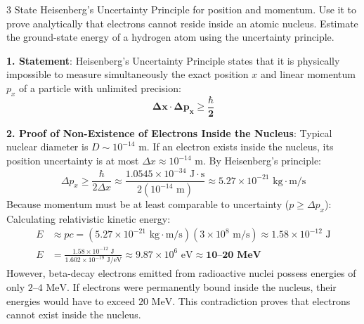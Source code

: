 \vspace{4mm}

\begin{theoryq}{3}
State Heisenberg's Uncertainty Principle for position and momentum. Use it to prove analytically that electrons cannot reside inside an atomic nucleus. Estimate the ground-state energy of a hydrogen atom using the uncertainty principle.
\end{theoryq}
\begin{theorysol}
\textbf{1. Statement}:
Heisenberg's Uncertainty Principle states that it is physically impossible to measure simultaneously the exact position $x$ and linear momentum $p_x$ of a particle with unlimited precision:
\begin{equation}
\mathbf{\Delta x \cdot \Delta p_x \ge \frac{\hbar}{2}}
\end{equation}

\textbf{2. Proof of Non-Existence of Electrons Inside the Nucleus}:
Typical nuclear diameter is $D \sim 10^{-14}\text{ m}$. If an electron exists inside the nucleus, its position uncertainty is at most $\Delta x \approx 10^{-14}\text{ m}$.
By Heisenberg's principle:
\begin{equation}
\Delta p_x \ge \frac{\hbar}{2\Delta x} \approx \frac{1.0545 \times 10^{-34}\text{ J}\cdot\text{s}}{2(10^{-14}\text{ m})} \approx 5.27 \times 10^{-21}\text{ kg}\cdot\text{m/s}
\end{equation}
Because momentum must be at least comparable to uncertainty ($p \ge \Delta p_x$):
Calculating relativistic kinetic energy:
\begin{align*}
E &\approx p c = (5.27 \times 10^{-21}\text{ kg}\cdot\text{m/s})(3 \times 10^8\text{ m/s}) \approx 1.58 \times 10^{-12}\text{ J} \\
E &= \frac{1.58 \times 10^{-12}\text{ J}}{1.602 \times 10^{-19}\text{ J/eV}} \approx 9.87 \times 10^6\text{ eV} \approx \mathbf{10\text{--}20\text{ MeV}}
\end{align*}
However, beta-decay electrons emitted from radioactive nuclei possess energies of only $2\text{--}4\text{ MeV}$. If electrons were permanently bound inside the nucleus, their energies would have to exceed $20\text{ MeV}$. This contradiction proves that electrons cannot exist inside the nucleus.


\end{theorysol}
